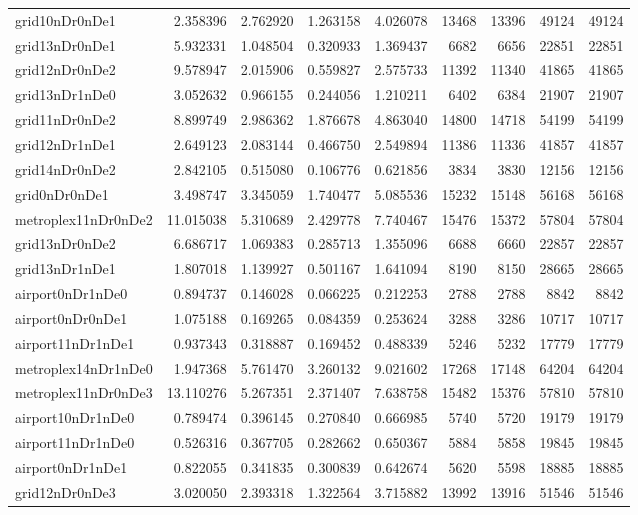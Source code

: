 \begin{longtable}{|l|r|r|r|r|r|r|r|r|}
grid10nDr0nDe1 & 2.358396 & 2.762920 & 1.263158 & 4.026078 & 13468 & 13396 & 49124 & 49124 \\
grid13nDr0nDe1 & 5.932331 & 1.048504 & 0.320933 & 1.369437 & 6682 & 6656 & 22851 & 22851 \\
grid12nDr0nDe2 & 9.578947 & 2.015906 & 0.559827 & 2.575733 & 11392 & 11340 & 41865 & 41865 \\
grid13nDr1nDe0 & 3.052632 & 0.966155 & 0.244056 & 1.210211 & 6402 & 6384 & 21907 & 21907 \\
grid11nDr0nDe2 & 8.899749 & 2.986362 & 1.876678 & 4.863040 & 14800 & 14718 & 54199 & 54199 \\
grid12nDr1nDe1 & 2.649123 & 2.083144 & 0.466750 & 2.549894 & 11386 & 11336 & 41857 & 41857 \\
grid14nDr0nDe2 & 2.842105 & 0.515080 & 0.106776 & 0.621856 & 3834 & 3830 & 12156 & 12156 \\
grid0nDr0nDe1 & 3.498747 & 3.345059 & 1.740477 & 5.085536 & 15232 & 15148 & 56168 & 56168 \\
metroplex11nDr0nDe2 & 11.015038 & 5.310689 & 2.429778 & 7.740467 & 15476 & 15372 & 57804 & 57804 \\
grid13nDr0nDe2 & 6.686717 & 1.069383 & 0.285713 & 1.355096 & 6688 & 6660 & 22857 & 22857 \\
grid13nDr1nDe1 & 1.807018 & 1.139927 & 0.501167 & 1.641094 & 8190 & 8150 & 28665 & 28665 \\
airport0nDr1nDe0 & 0.894737 & 0.146028 & 0.066225 & 0.212253 & 2788 & 2788 & 8842 & 8842 \\
airport0nDr0nDe1 & 1.075188 & 0.169265 & 0.084359 & 0.253624 & 3288 & 3286 & 10717 & 10717 \\
airport11nDr1nDe1 & 0.937343 & 0.318887 & 0.169452 & 0.488339 & 5246 & 5232 & 17779 & 17779 \\
metroplex14nDr1nDe0 & 1.947368 & 5.761470 & 3.260132 & 9.021602 & 17268 & 17148 & 64204 & 64204 \\
metroplex11nDr0nDe3 & 13.110276 & 5.267351 & 2.371407 & 7.638758 & 15482 & 15376 & 57810 & 57810 \\
airport10nDr1nDe0 & 0.789474 & 0.396145 & 0.270840 & 0.666985 & 5740 & 5720 & 19179 & 19179 \\
airport11nDr1nDe0 & 0.526316 & 0.367705 & 0.282662 & 0.650367 & 5884 & 5858 & 19845 & 19845 \\
airport0nDr1nDe1 & 0.822055 & 0.341835 & 0.300839 & 0.642674 & 5620 & 5598 & 18885 & 18885 \\
grid12nDr0nDe3 & 3.020050 & 2.393318 & 1.322564 & 3.715882 & 13992 & 13916 & 51546 & 51546 \\

\end{longtable}
